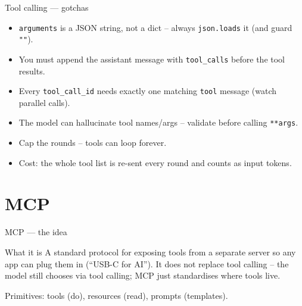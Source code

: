 \documentclass[aspectratio=169,10pt]{beamer}
\begin{document}
\begin{frame}{Tool calling --- gotchas}
  \begin{itemize}
    \item \alert{\texttt{arguments} is a JSON string}, not a dict -- always \texttt{json.loads} it (and guard \texttt{""}).
    \item You must \alert{append the assistant message with \texttt{tool\_calls} before} the tool results.
    \item \alert{Every \texttt{tool\_call\_id} needs exactly one} matching \texttt{tool} message (watch parallel calls).
    \item The model can \alert{hallucinate} tool names/args -- validate before calling \texttt{**args}.
    \item \alert{Cap the rounds} -- tools can loop forever.
    \item \alert{Cost:} the whole tool list is re-sent every round and counts as input tokens.
  \end{itemize}
\end{frame}

\section{MCP}

\begin{frame}[fragile]{MCP --- the idea}
  \begin{block}{What it is}
    A \alert{standard protocol} for exposing tools from a \alert{separate server} so any app
    can plug them in (``USB-C for AI''). It does \alert{not} replace tool calling -- the model
    still chooses via tool calling; MCP just standardises where tools live.
  \end{block}
  \begin{center}
  \end{center}
  \footnotesize Primitives: \alert{tools} (do), \alert{resources} (read), \alert{prompts} (templates).
\end{frame}
\end{document}
